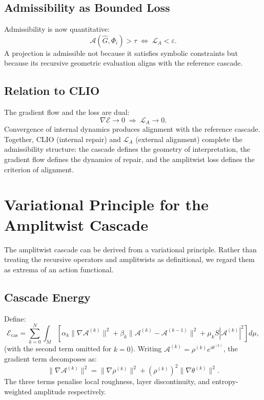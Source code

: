 \documentclass[11pt, a4paper]{article}
\begin{document}
\subsection{Admissibility as Bounded Loss}

Admissibility is now quantitative:
\[
  \mathcal{A}(\hat{G}, \Phi_i) > \tau
  \;\Longleftrightarrow\;
  \mathcal{L}_A < \varepsilon.
\]
A projection is admissible not because it satisfies symbolic constraints
but because its recursive geometric evaluation aligns with the reference
cascade.

\subsection{Relation to CLIO}

The gradient flow and the loss are dual:
\[
  \nabla\mathcal{E} \to 0
  \;\Rightarrow\;
  \mathcal{L}_A \to 0.
\]
Convergence of internal dynamics produces alignment with the reference
cascade. Together, CLIO (internal repair) and $\mathcal{L}_A$ (external
alignment) complete the admissibility structure: the cascade defines the
geometry of interpretation, the gradient flow defines the dynamics of
repair, and the amplitwist loss defines the criterion of alignment.

\section{Variational Principle for the Amplitwist Cascade}

The amplitwist cascade can be derived from a variational principle.
Rather than treating the recursive operators and amplitwists as
definitional, we regard them as extrema of an action functional.

\subsection{Cascade Energy}

Define:
\[
  \mathcal{E}_{\mathrm{cas}}
  = \sum_{k=0}^{N} \int_M
  \left[
    \alpha_k \|\nabla\mathcal{A}^{(k)}\|^2
    + \beta_k \|\mathcal{A}^{(k)} - \mathcal{A}^{(k-1)}\|^2
    + \mu_k S|\mathcal{A}^{(k)}|^2
  \right] d\mu,
\]
(with the second term omitted for $k=0$). Writing $\mathcal{A}^{(k)} =
\rho^{(k)}e^{i\theta^{(k)}}$, the gradient term decomposes as:
\[
  \|\nabla\mathcal{A}^{(k)}\|^2
  = \|\nabla\rho^{(k)}\|^2
  + (\rho^{(k)})^2\|\nabla\theta^{(k)}\|^2.
\]
The three terms penalise local roughness, layer discontinuity, and
entropy-weighted amplitude respectively.
\end{document}
